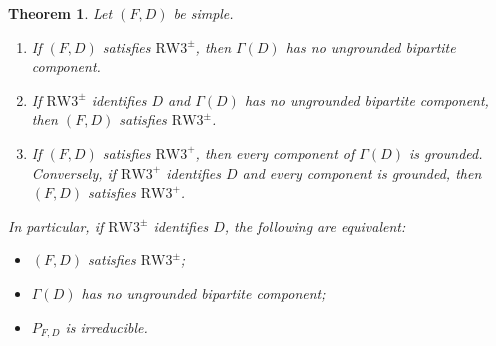 \documentclass[11pt,a4paper]{article}
\newtheorem{theorem}{Theorem}[section]
\theoremstyle{definition}
\newcommand{\RW}{\mathrm{RW3}^{+}}
\newcommand{\SG}{\mathrm{RW3}^{\pm}}
\begin{document}
\begin{theorem}\label{thm:orthogonality-completeness}
Let $(F,D)$ be simple.
\begin{enumerate}[label=(\alph*)]
\item If $(F,D)$ satisfies $\SG$, then $\Gamma(D)$ has no ungrounded
      bipartite component.
\item If $\SG$ identifies $D$ and $\Gamma(D)$ has no ungrounded bipartite
      component, then $(F,D)$ satisfies $\SG$.
\item If $(F,D)$ satisfies $\RW$, then every component of $\Gamma(D)$ is
      grounded. Conversely, if $\RW$ identifies $D$ and every component is
      grounded, then $(F,D)$ satisfies $\RW$.
\end{enumerate}
In particular, if $\SG$ identifies $D$, the following are equivalent:
\begin{itemize}
\item $(F,D)$ satisfies $\SG$;
\item $\Gamma(D)$ has no ungrounded bipartite component;
\item $P_{F,D}$ is irreducible.
\end{itemize}
\end{theorem}
\end{document}
